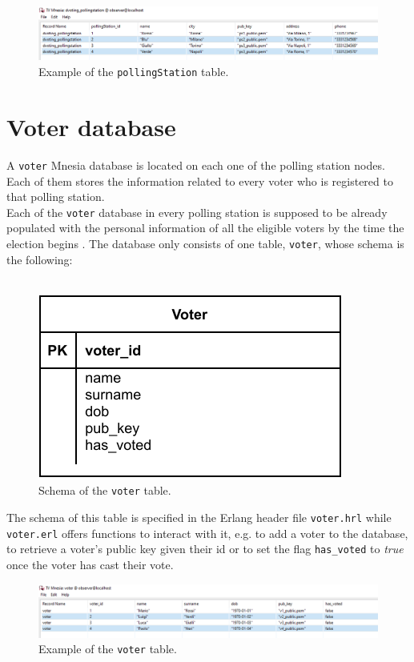 \begin{figure}[H]
    \begin{center}
        \includegraphics[scale=0.6]{img/pollingstation_db_screen.png}
    \end{center}
    \vspace*{-0.5cm}
    \caption{Example of the \texttt{pollingStation} table.}
    \label{fig:pollingStations_db}
\end{figure}

\section{Voter database}\label{sec:voters_db}
A \texttt{voter} Mnesia database is located on each one of the polling station nodes. Each of them stores the information related to every voter who is registered to that polling station.\\
Each of the \texttt{voter} database in every polling station is supposed to be already populated with the personal information of all the eligible voters by the time the election begins .
The database only consists of one table, \texttt{voter}, whose schema is the following:\\
\
\begin{figure}[H]
    \begin{center}
        \includegraphics[scale=1]{img/voter_schema.pdf}
    \end{center}
    \vspace*{-0.5cm}
    \caption{Schema of the \texttt{voter} table.}
    \label{fig:voter_schema}
\end{figure}

The schema of this table is specified in the Erlang header file \texttt{voter.hrl} while \texttt{voter.erl} offers functions to interact with it, e.g. to add a voter to the database, to retrieve a voter's public key given their id or to set the flag \texttt{has\_voted} to \textit{true} once the voter has cast their vote.\\

\begin{figure}[H]
    \begin{center}
        \includegraphics[scale=0.6]{img/voter_db_screen.png}
    \end{center}
    \vspace*{-0.5cm}
    \caption{Example of the \texttt{voter} table.}
    \label{fig:voter_db}
\end{figure}
